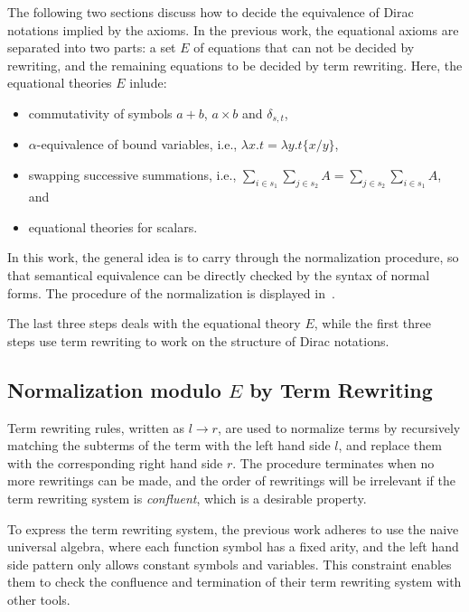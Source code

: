 \documentclass[runningheads]{llncs}
\begin{document}
The following two sections discuss how to decide the equivalence of Dirac notations implied by the axioms.
In the previous work, the equational axioms are separated into two parts: a set $E$ of equations that can not be decided by rewriting, and the remaining equations to be decided by term rewriting.
Here, the equational theories $E$ inlude:
\begin{itemize}
    \item commutativity of symbols $a + b$, $a\times b$ and $\delta_{s, t}$,
    \item $\alpha$-equivalence of bound variables, i.e., $\lambda x.t = \lambda y . t\{x/y\}$,
    \item swapping successive summations, i.e., $\sum_{i \in s_1} \sum_{j \in s_2} A = \sum_{j \in s_2} \sum_{i \in s_1}A$, and
    \item equational theories for scalars.
\end{itemize}

In this work, the general idea is to carry through the normalization procedure, so that semantical equivalence can be directly checked by the syntax of normal forms. The procedure of the normalization is displayed in~.



The last three steps deals with the equational theory $E$, while the first three steps use term rewriting to work on the structure of Dirac notations.


\subsection{Normalization modulo $E$ by Term Rewriting}
Term rewriting rules, written as $l \to r$, are used to normalize terms by recursively matching the subterms of the term with the left hand side $l$, and replace them with the corresponding right hand side $r$. The procedure terminates when no more rewritings can be made, and the order of rewritings will be irrelevant if the term rewriting system is \textit{confluent}, which is a desirable property.

To express the term rewriting system, the previous work adheres to use the naive universal algebra, where each function symbol has a fixed arity, and the left hand side pattern only allows constant symbols and variables. This constraint enables them to check the confluence and termination of their term rewriting system with other tools.

\end{document}
